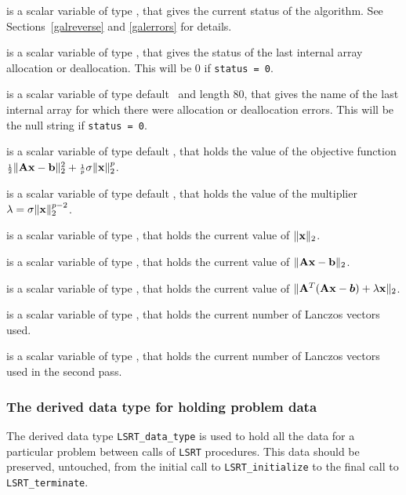 \documentclass{galahad}
\newcommand{\packagename}{LS\-RT}
\begin{document}
\begin{description}
 is a scalar variable of type \integer, that gives the
current status of the algorithm. See Sections~\ref{galreverse} and
\ref{galerrors} for details.

 is a scalar variable of type \integer,
that gives the status of the last internal array allocation
or deallocation. This will be 0 if {\tt status = 0}.

 is a scalar variable of type default \character\
and length 80, that  gives the name of the last internal array
for which there were allocation or deallocation errors.
This will be the null string if {\tt status = 0}.

 is a scalar variable of type default
\realdp, that holds the value of the objective function
${\scriptstyle \frac{1}{2}}\| {\mathbf{A}} {\mathbf{x}} - {\mathbf{b}}\|_2^2 + {\scriptstyle \frac{1}{p}} \sigma \| {\mathbf{x}} \|_2^p$.

 is a scalar variable of type default
\realdp, that holds the
value of the multiplier $\lambda = \sigma \|{\mathbf{x}}\|_2^{p-2}$.

 is a scalar variable of type \realdp,
that holds the current value of $\|{\mathbf{x}}\|_2$.

 is a scalar variable of type \realdp,
that holds the current value of $\|{\mathbf{A}}{\mathbf{x}}-{\mathbf{b}}\|_2$.

 is a scalar variable of type \realdp,
that holds the current value of
$\|{\mathbf{A}}^T ( {\mathbf{A}} {\mathbf{x}} - \bm b ) + \lambda {\mathbf{x}} \|_2$.

 is a scalar variable of type \integer, that holds the
current number of Lanczos vectors used.

 is a scalar variable of type \integer, that holds the
current number of Lanczos vectors used in the second pass.

\end{description}


\subsubsection{The derived data type for holding problem data}\label{typedata}
The derived data type
{\tt \packagename\_data\_type}
is used to hold all the data for a particular problem between calls of
{\tt \packagename} procedures.
This data should be preserved, untouched, from the initial call to
{\tt \packagename\_initialize}
to the final call to
{\tt \packagename\_terminate}.
\end{document}
